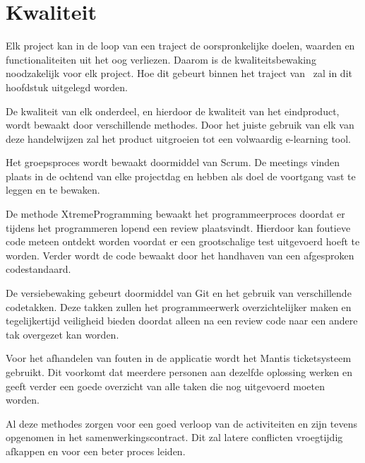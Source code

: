 \chapter{Kwaliteit} 
Elk project kan in de loop van een traject de oorspronkelijke doelen, waarden en functionaliteiten uit het oog verliezen. Daarom is de kwaliteitsbewaking noodzakelijk voor elk project. Hoe dit gebeurt binnen het traject van \projectname\ zal in dit hoofdstuk uitgelegd worden.

De kwaliteit van elk onderdeel, en hierdoor de kwaliteit van het eindproduct, wordt bewaakt door verschillende methodes. Door het juiste gebruik van elk van deze handelwijzen zal het product uitgroeien tot een volwaardig e-learning tool.

Het groepsproces wordt bewaakt doormiddel van Scrum. De meetings vinden plaats in de ochtend van elke projectdag en hebben als doel de voortgang vast te leggen en te bewaken.

De methode XtremeProgramming bewaakt het programmeerproces doordat er tijdens het programmeren lopend een review plaatsvindt. Hierdoor kan foutieve code meteen ontdekt worden voordat er een grootschalige test uitgevoerd hoeft te worden.
Verder wordt de code bewaakt door het handhaven van een afgesproken codestandaard.

De versiebewaking gebeurt doormiddel van Git en het gebruik van verschillende codetakken. Deze takken zullen het programmeerwerk overzichtelijker maken en tegelijkertijd veiligheid bieden doordat alleen na een review code naar een andere tak overgezet kan worden.

Voor het afhandelen van fouten in de applicatie wordt het Mantis ticketsysteem gebruikt. Dit voorkomt dat meerdere personen aan dezelfde oplossing werken en geeft verder een goede overzicht van alle taken die nog uitgevoerd moeten worden.

Al deze methodes zorgen voor een goed verloop van de activiteiten en zijn tevens opgenomen in het samenwerkingscontract. Dit zal latere conflicten vroegtijdig afkappen en voor een beter proces leiden.
